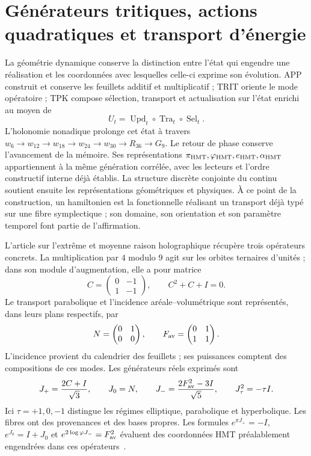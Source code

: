\section{Générateurs tritiques, actions quadratiques et transport d’énergie}
\label{sec:hamiltonianos-curvatura}

La géométrie dynamique conserve la distinction entre l’état qui engendre une
réalisation et les coordonnées avec lesquelles celle-ci exprime son évolution. APP
construit et conserve les feuillets additif et multiplicatif ; TRIT oriente le
mode opératoire ; TPK compose sélection, transport et actualisation sur
l’état enrichi au moyen de
\[
 U_t=\operatorname{Upd}_t\circ\operatorname{Tra}_t\circ
 \operatorname{Sel}_t.
\]
L'holonomie nonadique prolonge cet état à travers \(w_6\to w_{12}\to w_{18}\to w_{24}\to w_{30}\to R_{36}\to G_9\). Le retour de phase conserve l'avancement de la mémoire. Ses représentations \(\pi_{\rm HMT},\varphi_{\rm HMT},e_{\rm HMT},\alpha_{\rm HMT}\) appartiennent à la même génération corrélée, avec les lecteurs et l'ordre constructif interne déjà établis. La structure discrète conjointe du continu soutient ensuite les représentations géométriques et physiques. À ce point de la construction, un hamiltonien est la fonctionnelle réalisant un transport déjà typé sur une fibre symplectique ; son domaine, son orientation et son paramètre temporel font partie de l'affirmation.

L’article sur l’extrême et moyenne raison holographique récupère trois
opérateurs concrets. La multiplication par \(4\) modulo \(9\) agit sur
les orbites ternaires d’unités ; dans son module d’augmentation, elle a pour matrice
\[
 C=\begin{pmatrix}0&-1\\1&-1\end{pmatrix},\qquad C^2+C+I=0.
\]
Le transport parabolique et l’incidence aréale--volumétrique sont
représentés, dans leurs plans respectifs, par
\[
 N=\begin{pmatrix}0&1\\0&0\end{pmatrix},\qquad
 F_{\rm av}=\begin{pmatrix}0&1\\1&1\end{pmatrix}.
\]
L'incidence provient du calendrier des feuillets ; ses puissances comptent des compositions de ces modes. Les générateurs réels exprimés sont
\begin{equation}
 J_+=\frac{2C+I}{\sqrt3},\qquad J_0=N,\qquad
 J_-=\frac{2F_{\rm av}^{2}-3I}{\sqrt5},\qquad
 J_\tau^2=-\tau I.
 \label{eq:hc-generadores}
\end{equation}
Ici \(\tau=+1,0,-1\) distingue les régimes elliptique, parabolique et
hyperbolique. Les fibres ont des provenances et des bases propres. Les formules
\(e^{\pi J_+}=-I\), \(e^{J_0}=I+J_0\) et
\(e^{2\log\varphi J_-}=F_{\rm av}^{2}\) évaluent des coordonnées HMT
préalablement engendrées dans ces opérateurs~\cite{hmtX}.

